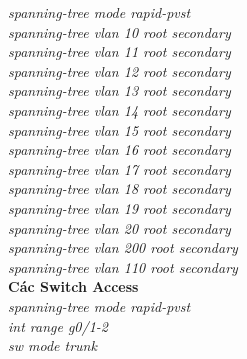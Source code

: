 \documentclass[a4paper, 12pt]{article}
\begin{document}
\hspace*{2cm}\textit{spanning-tree mode rapid-pvst\\
\hspace*{2cm}spanning-tree vlan 10 root secondary\\
\hspace*{2cm}spanning-tree vlan 11 root secondary\\
\hspace*{2cm}spanning-tree vlan 12 root secondary\\
\hspace*{2cm}spanning-tree vlan 13 root secondary\\
\hspace*{2cm}spanning-tree vlan 14 root secondary\\
\hspace*{2cm}spanning-tree vlan 15 root secondary\\
\hspace*{2cm}spanning-tree vlan 16 root secondary\\
\hspace*{2cm}spanning-tree vlan 17 root secondary\\
\hspace*{2cm}spanning-tree vlan 18 root secondary\\
\hspace*{2cm}spanning-tree vlan 19 root secondary\\
\hspace*{2cm}spanning-tree vlan 20 root secondary\\
\hspace*{2cm}spanning-tree vlan 200 root secondary\\
\hspace*{2cm}spanning-tree vlan 110 root secondary\\}
\hspace*{2cm}\textbf{Các Switch Access}\\
\hspace*{2cm}\textit{spanning-tree mode rapid-pvst\\
\hspace*{2cm}int range g0/1-2\\
\hspace*{2cm}sw mode trunk\\}
\end{document}
